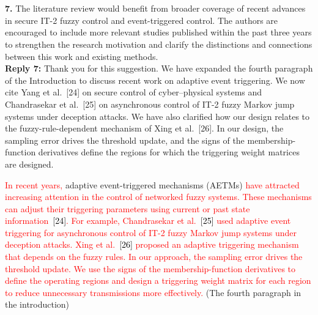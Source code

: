 \documentclass[10pt,fleqn]{article}
\begin{document}
~\\
\\
\textbf{7.} The literature review would benefit from broader coverage of recent advances in secure IT-2 fuzzy control and event-triggered control. The authors are encouraged to include more relevant studies published within the past three years to strengthen the research motivation and clarify the distinctions and connections between this work and existing methods.
\\[10pt]
\begingroup
\setlength{\parskip}{6pt}
\indent \textbf{Reply 7:} Thank you for this suggestion. We have expanded the fourth paragraph of the Introduction to discuss recent work on adaptive event triggering. We now cite Yang et al.~[24] on secure control of cyber--physical systems and Chandrasekar et al.~[25] on asynchronous control of IT-2 fuzzy Markov jump systems under deception attacks. We have also clarified how our design relates to the fuzzy-rule-dependent mechanism of Xing et al.~[26]. In our design, the sampling error drives the threshold update, and the signs of the membership-function derivatives define the regions for which the triggering weight matrices are designed.\par
\noindent \textcolor{red}{In recent years,} adaptive event-triggered mechanisms (AETMs) \textcolor{red}{have attracted increasing attention in the control of networked fuzzy systems. These mechanisms can adjust their triggering parameters using current or past state information~\textcolor{black}{[24]}. For example, Chandrasekar et al.~\textcolor{black}{[25]} used adaptive event triggering for asynchronous control of IT-2 fuzzy Markov jump systems under deception attacks. Xing et al.~\textcolor{black}{[26]} proposed an adaptive triggering mechanism that depends on the fuzzy rules. In our approach, the sampling error drives the threshold update. We use the signs of the membership-function derivatives to define the operating regions and design a triggering weight matrix for each region to reduce unnecessary transmissions more effectively.} (The fourth paragraph in the introduction)\par
\endgroup\vspace{\baselineskip}
\end{document}
